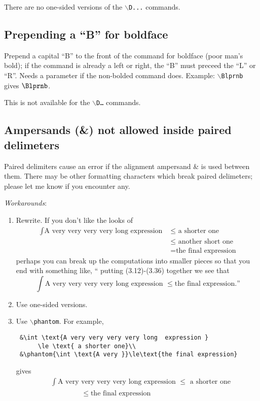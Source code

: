 \documentclass{amsart}
\begin{document}
There are no  one-sided versions of the \texttt{$\backslash$D...} commands.

\subsection{Prepending a ``B'' for  boldface}
Prepend a capital ``B'' to the front of the  command for
 boldface (poor man's bold); if
the command is already a left or right, the ``B'' must 
preceed the ``L'' or ``R''. Needs a parameter if the
non-bolded command does. Example: \texttt{$\backslash$Blprnb} gives $\Blprnb$.

This is not available for the $\backslash$\texttt{D\dots} commands.

 \subsection{Ampersands (\&) not allowed inside paired delimeters} 
 Paired delimiters cause an error if the alignment 
 ampersand \& is used between them.
 There may be other formatting characters which break 
 paired delimeters; please let me know if you
 encounter any.
 
 \textit{Workarounds}:
 \begin{enumerate}
 \item Rewrite. If you don't like the looks of
 \begin{align*}
 \int \text{A very very very very long  expression }&\le \text{ a shorter one}\\
 &\le\text{ another short one}\\
 &=\text{the final expression}
 \end{align*}
 perhaps you can break up the computations into
  smaller pieces so that you end with something like,
 `` putting (3.12)-(3.36) together we see that
 \[
 \int \text{A very very very very long  
 expression }\le \text{the final expression}.\text{''}
 \]
 
 \item Use one-sided versions.
 
 \item Use $\backslash$\texttt{phantom}. For example,
  \begin{verbatim}
 &\int \text{A very very very very long  expression }
      \le \text{ a shorter one}\\
 &\phantom{\int \text{A very }}\le\text{the final expression}
  \end{verbatim}
  \vspace{-10pt}

 gives
 \begin{align*}
 &\int \text{A very very very very long  expression }
      \le \text{ a shorter one}\\
 &\phantom{\int \text{A very }}\le\text{the final expression}
  \end{align*}
  
 \end{enumerate}
 
\end{document}
